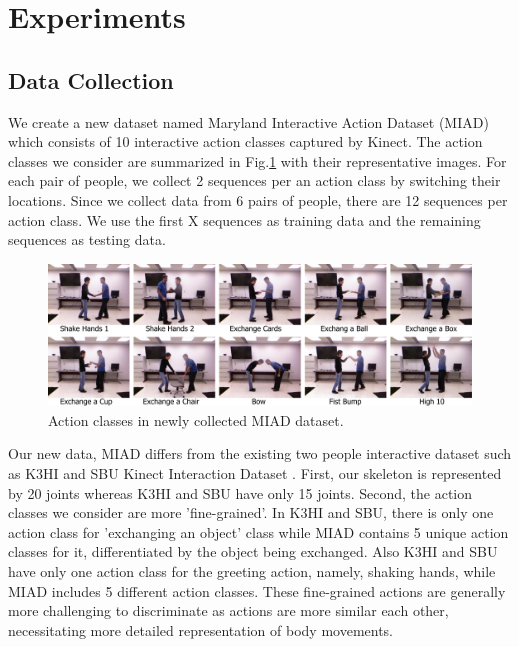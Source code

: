 \documentclass[10pt,twocolumn,letterpaper]{article}
\begin{document}
\section{Experiments}

\subsection{Data Collection}

We create a new dataset named Maryland Interactive Action Dataset (MIAD) which consists of 10 interactive action classes captured by Kinect. The action classes we consider are summarized in Fig.\ref{fig:newactions} with their representative images. For each pair of people, we collect 2 sequences per an action class by switching their locations. Since we collect data from 6 pairs of people, there are 12 sequences per action class. We use the first X sequences as training data and the remaining sequences as testing data.

\begin{figure}[htb]
\begin{center}
\includegraphics[width=6.8in]{newactions.pdf}
\caption{Action classes in newly collected MIAD dataset.  \label{fig:newactions}}
\end{center}
\end{figure}

Our new data, MIAD differs from the existing two people interactive dataset such as K3HI \cite{K3HI} and SBU Kinect Interaction Dataset \cite{Yun2012}. First, our skeleton is represented by 20 joints whereas K3HI and SBU have only 15 joints. Second, the action classes we consider are more 'fine-grained'. In K3HI and SBU, there is only one action class for 'exchanging an object' class while MIAD contains 5 unique action classes for it, differentiated by the object being exchanged. Also K3HI and SBU have only one action class for the greeting action, namely, shaking hands, while MIAD includes 5 different action classes. These fine-grained actions are generally more challenging to discriminate as actions are more similar each other, necessitating more detailed representation of body movements.
\end{document}
